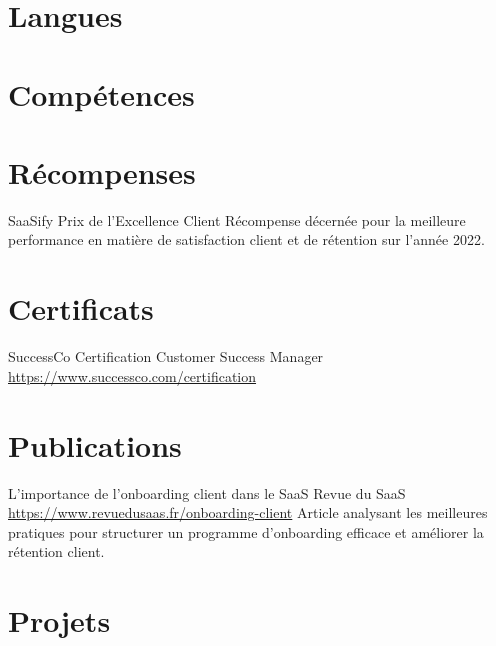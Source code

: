 \documentclass[a4paper, serif, 10pt]{moderncv}
\begin{document}
\section{Langues}

\section{Compétences}

\section{Récompenses}

        {SaaSify}
        {Prix de l'Excellence Client}
        {}
        {}
        {Récompense décernée pour la meilleure performance en matière de satisfaction client et de rétention sur l'année 2022.}
\section{Certificats}

        {SuccessCo}
        {Certification Customer Success Manager}
        {\url{https://www.successco.com/certification}}
        {}
        {}
\section{Publications}

        {L'importance de l'onboarding client dans le SaaS}
        {Revue du SaaS}
        {\url{https://www.revuedusaas.fr/onboarding-client}}
        {}
        {Article analysant les meilleures pratiques pour structurer un programme d'onboarding efficace et améliorer la rétention client.}
\section{Projets}
\end{document}
